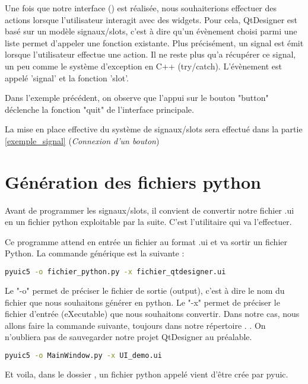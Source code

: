 \documentclass[12pt]{report}    %
\begin{document}
Une fois que notre interface () est réalisée, nous souhaiterions effectuer des actions lorsque l'utilisateur interagit avec des widgets. \newline \newline
Pour cela, QtDesigner est basé sur un modèle signaux/slots, c'est à dire qu'un évènement choisi parmi une liste permet d'appeler une fonction existante. \newline
Plus précisément, un signal est émit lorsque l'utilisateur effectue une action. Il ne reste plus qu'a récupérer ce signal, un peu comme le système d'exception en C++ (try/catch).
L'évènement est appelé 'signal' et la fonction 'slot'. \newline \newline



Dans l'exemple précédent, on observe que l'appui sur le bouton "button" déclenche la fonction "quit" de l'interface principale.

La mise en place effective du système de signaux/slots sera effectué dans la partie  \ref{exemple_signal} (\textit{Connexion d'un bouton})

\section{Génération des fichiers python}

Avant de programmer les signaux/slots, il convient de convertir notre fichier .ui en un fichier python exploitable par la suite. C'est l'utilitaire  qui va l'effectuer. \newline

Ce programme attend en entrée un fichier au format .ui et va sortir un fichier Python. La commande générique est la suivante : 

\begin{lstlisting}[language=bash]
pyuic5 -o fichier_python.py -x fichier_qtdesigner.ui
\end{lstlisting}

Le "-o" permet de préciser le fichier de sortie (output), c'est à dire le nom du fichier que nous souhaitons générer en python. \newline \newline
Le "-x" permet de préciser le fichier d'entrée (eXecutable) que nous souhaitons convertir. \newline \newline
Dans notre cas, nous allons faire la commande suivante, toujours dans notre répertoire . \newline.
On n'oubliera pas de sauvegarder notre projet QtDesigner au préalable.
\begin{lstlisting}[language=bash]
pyuic5 -o MainWindow.py -x UI_demo.ui
\end{lstlisting}
Et voila, dans le dossier , un fichier python appelé  vient d'être crée par pyuic. \newline
\end{document}
